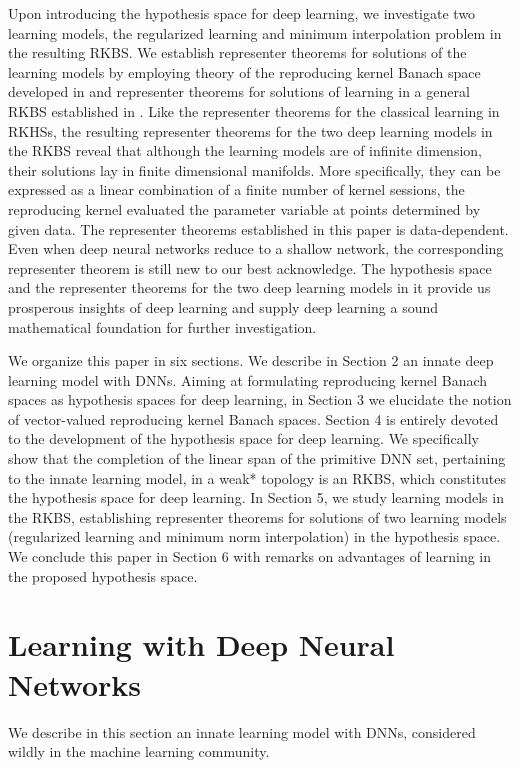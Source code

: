 \documentclass[11pt]{article}
\begin{document}
Upon introducing the hypothesis space for deep learning, we investigate two learning models, the regularized learning and minimum interpolation problem in the resulting RKBS. We establish representer theorems for solutions of the learning models by employing theory of the reproducing kernel Banach space developed in \cite{xu2022sparse, xu2019generalized,  zhang2009reproducing} and representer theorems for solutions of learning in a general RKBS established in \cite{ChengWangXu2023, wang2021representer, wang2023sparse}. %
Like the representer theorems for the classical learning in RKHSs, 
the resulting representer theorems for the two deep learning models in the RKBS reveal that although the learning models  are of infinite dimension, their solutions lay in finite dimensional manifolds. More specifically, they can be expressed as a linear combination of a finite number of kernel sessions, the reproducing kernel evaluated the parameter variable at points determined by given data. The representer theorems established in this paper is data-dependent. Even when deep neural networks reduce to a shallow network, the corresponding representer theorem is still new to our best acknowledge. The hypothesis space and the representer theorems for the two deep learning models in it provide us prosperous insights of deep learning and supply deep learning a sound mathematical foundation for further investigation.



We organize this paper in six sections. We describe in Section 2 an innate deep learning model with DNNs. Aiming at formulating reproducing kernel Banach spaces as hypothesis spaces for deep learning, in Section 3 we elucidate the notion of vector-valued reproducing kernel Banach spaces. Section 4 is entirely devoted to the development of the hypothesis space for deep learning. We specifically show that the completion of the linear span of the primitive DNN set, pertaining to the innate learning model, in a weak* topology is an RKBS, which constitutes the hypothesis space for deep learning. In Section 5, we study learning models in the RKBS, establishing representer theorems for solutions of two learning models (regularized learning and minimum norm interpolation) in the hypothesis space. We conclude this paper in Section 6 with remarks on advantages of learning in the proposed hypothesis space.

\section{Learning with Deep Neural Networks}
We describe in this section an innate learning model with DNNs, considered wildly in the machine learning community.  
\end{document}
